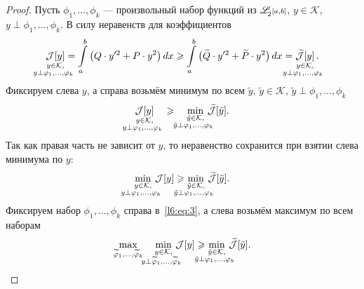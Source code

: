 \documentclass[12pt,a4paper,openany,fleqn]{book}
\newcommand{\J}{\ensuremath{\mathcal{J}}}
\newcommand{\mc}[1]{\ensuremath{\mathcal{#1}}}
\newcommand{\K}{\mc{K}}
\newcommand{\fL}[1][{[a,b]}]{\ensuremath{\mathscr{L}\hspace*{-0.11 cm}{\mathstrut}_{2}\scriptstyle#1}}
\theoremstyle{definition}
\begin{document}
	\begin{proof}
		Пусть $\phi_1,\ldots,\phi_k$ --- произвольный набор функций из \fL, $y\in\K$, $y\perp\phi_1,\ldots,\phi_k$. В силу неравенств для коэффициентов 
		\begin{equation}
			\label{l6:eq:1}
			\hfill \mathop{\J[y]}\limits_{\substack{y\in\K,\\\lefteqn{\scriptstyle \hspace*{-0.8cm}y\perp\phi_1,\ldots,\phi_{k}}}}=\int\limits_a^b\big(Q\cdot y'^2+P\cdot y^2\big)\,dx\geqslant\int\limits_a^b\big(\widetilde{Q}\cdot y'^2+\widetilde{P}\cdot y^2\big)\,dx=\mathop{\widetilde{\J}[y]}\limits_{\substack{y\in\K,\\\lefteqn{\scriptstyle \hspace*{-0.8cm}y\perp\phi_1,\ldots,\phi_{k}}}}.\hfill
		\end{equation}
		Фиксируем слева $y$, а справа возьмём минимум по всем $\tilde{y}$, $\tilde{y}\in\K$, $\tilde{y}\perp \phi_1,\ldots,\phi_k$
		\begin{equation}
			\label{l6:eq:2}
			\hfill\mathop{\J[y]}\limits_{\substack{y\in\K,\\\lefteqn{\scriptstyle \hspace*{-0.8cm}y\perp\phi_1,\ldots,\phi_{k}}}}\quad\geqslant\quad\min\limits_{\substack{\tilde{y}\in\K,\\\lefteqn{\scriptstyle \hspace*{-0.8cm}\tilde{y}\perp\phi_1,\ldots,\phi_{k}}}}\,\widetilde{\J}[\tilde{y}].\hfill
		\end{equation}
		Так как правая часть не зависит от $y$, то неравенство сохранится при взятии слева минимума по $y$:
		\begin{equation}
			\label{l6:eq:3}
			\hfill\min\limits_{\substack{y\in\K,\\\lefteqn{\scriptstyle \hspace*{-0.8cm}y\perp\phi_1,\ldots,\phi_{k}}}}\,\J[y]\geqslant\min\limits_{\substack{\tilde{y}\in\K,\\\lefteqn{\scriptstyle \hspace*{-0.8cm}\tilde{y}\perp\phi_1,\ldots,\phi_{k}}}}\,\widetilde{\J}[\tilde{y}].\hfill
		\end{equation}
		Фиксируем набор $\phi_1,\ldots,\phi_k$ справа в~\eqref{l6:eq:3}, а слева возьмём максимум по всем наборам
		\begin{equation}
			\label{l6:eq:4}
			\hfill\max\limits_{\widetilde{\phi}_1,\ldots,\widetilde{\phi}_k}\quad\min\limits_{\substack{y\in\K,\\\lefteqn{\scriptstyle \hspace*{-0.8cm}y\perp\widetilde{\phi}_1,\ldots,\widetilde{\phi}_{k}}}}\,\J[y]\geqslant\min\limits_{\substack{\tilde{y}\in\K,\\\lefteqn{\scriptstyle \hspace*{-0.8cm}\tilde{y}\perp\phi_1,\ldots,\phi_{k}}}}\,\widetilde{\J}[\tilde{y}].\hfill

\end{equation}
\end{proof}
\end{document}
